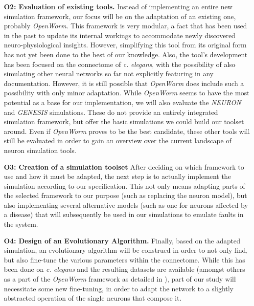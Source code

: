 \documentclass[a4paper,11pt]{article}
\begin{document}
\textbf{O2: Evaluation of existing tools.}
Instead of implementing an entire new simulation framework, our focus will be on the adaptation of an existing one, probably \emph{OpenWorm}. This framework is very modular, a fact that has been used in the past to update its internal workings to accommodate newly discovered neuro-physiological insights. However, simplifying this tool from its original form has not yet been done to the best of our knowledge. Also, the tool's development has been focused on the connectome of \emph{c. elegans}, with the possibility of also simulating other neural networks so far not explicitly featuring in any documentation. However, it is still possible that \emph{OpenWorm} does include such a possibility with only minor adaptation. While \emph{OpenWorm} seems to have the most potential as a base for our implementation, we will also evaluate the \emph{NEURON} and \emph{GENESIS} simulations. These do not provide an entirely integrated simulation framework, but offer the basic simulations we could build our toolset around. Even if \emph{OpenWorm} proves to be the best candidate, these other tools will still be evaluated in order to gain an overview over the current landscape of neuron simulation tools.

\textbf{O3: Creation of a simulation toolset}
After deciding on which framework to use and how it must be adapted, the next step is to actually implement the simulation according to our specification. This not only means adapting parts of the selected framework to our purpose (such as replacing the neuron model), but also implementing several alternative models (such as one for neurons affected by a disease) that will subsequently be used in our simulations to emulate faults in the system.

\textbf{O4: Design of an Evolutionary Algorithm.}
Finally, based on the adapted simulation, an evolutionary algorithm will be construed in order to not only find, but also fine-tune the various parameters within the connectome. While this has been done on \emph{c. elegans} and the resulting datasets are available (amongst others as a part of the \emph{OpenWorm} framework as detailed in \citep{Szigeti2014}), part of our study will necessitate some new fine-tuning, in order to adapt the network to a slightly abstracted operation of the single neurons that compose it.
\\[0,2cm]

\end{document}
